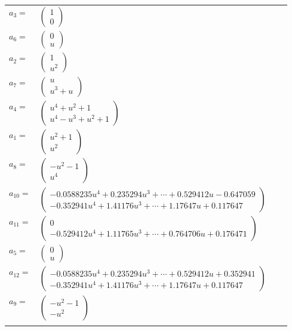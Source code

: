 \documentclass[1p]{elsarticle_modified}
\theoremstyle{definition}
\begin{document}
\begin{tabular}{m{7pt} m{180pt} m{7pt} m{180pt} }
\flushright $a_{3}=$&$\begin{pmatrix}1\\0\end{pmatrix}$ \\
\flushright $a_{6}=$&$\begin{pmatrix}0\\u\end{pmatrix}$ \\
\flushright $a_{2}=$&$\begin{pmatrix}1\\u^2\end{pmatrix}$ \\
\flushright $a_{7}=$&$\begin{pmatrix}u\\u^3+u\end{pmatrix}$ \\
\flushright $a_{4}=$&$\begin{pmatrix}u^4+u^2+1\\u^4- u^3+u^2+1\end{pmatrix}$ \\
\flushright $a_{1}=$&$\begin{pmatrix}u^2+1\\u^2\end{pmatrix}$ \\
\flushright $a_{8}=$&$\begin{pmatrix}- u^2-1\\u^4\end{pmatrix}$ \\
\flushright $a_{10}=$&$\begin{pmatrix}-0.0588235 u^{4}+0.235294 u^{3}+\cdots+0.529412 u-0.647059\\-0.352941 u^{4}+1.41176 u^{3}+\cdots+1.17647 u+0.117647\end{pmatrix}$ \\
\flushright $a_{11}=$&$\begin{pmatrix}0\\-0.529412 u^{4}+1.11765 u^{3}+\cdots+0.764706 u+0.176471\end{pmatrix}$ \\
\flushright $a_{5}=$&$\begin{pmatrix}0\\u\end{pmatrix}$ \\
\flushright $a_{12}=$&$\begin{pmatrix}-0.0588235 u^{4}+0.235294 u^{3}+\cdots+0.529412 u+0.352941\\-0.352941 u^{4}+1.41176 u^{3}+\cdots+1.17647 u+0.117647\end{pmatrix}$ \\
\flushright $a_{9}=$&$\begin{pmatrix}- u^2-1\\- u^2\end{pmatrix}$\\&\end{tabular}
\end{document}
